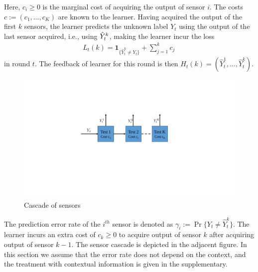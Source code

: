 Here, $c_i\ge 0$ is the marginal cost of acquiring the output of sensor $i$.
The costs $c := (c_1,\dots,c_K)$ are known to the learner.
Having acquired the output of the first $k$ sensors, the learner predicts the unknown label $Y_t$ using
the output of the last sensor acquired, i.e., using $\hat{Y}_t^k$, making the learner incur the loss
\begin{align*}
L_t(k)=\mathbf{1}_{\{\hat{Y}^k_t\neq Y_t\}}+\sum_{j=1}^k c_j\,
\end{align*}
in round $t$.
The feedback of learner for this round is then $H_t(k)=(\hat{Y}^1_t,\ldots,\hat{Y}^k_t)$.



\begin{figure}
	\vspace{-.5cm}
	\centering
	\includegraphics[scale=.6]{../Figures/cascade.pdf}
	\caption{Cascade of sensors
	}\label{wrap-fig:1}
	\vspace{-.5cm}
\end{figure} 

The prediction error rate of the $i^{th}$ sensor is denoted as $\gamma_i:=\Pr\{Y_t\neq \hat{Y}^k_t\}$. The learner incurs an extra cost of $c_k\geq 0$ to acquire output of sensor $k$ after acquiring output of sensor $k-1$. The sensor cascade is depicted in the adjacent figure. In this section we assume that the error rate does not depend on the  context, and the treatment with contextual information is given in the supplementary. 
\fi

